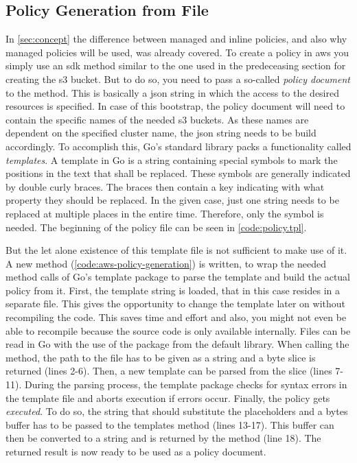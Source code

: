 \subsection{Policy Generation from File}
In \autoref{sec:concept} the difference between managed and inline policies, and also why managed policies will be used, was already covered.
To create a policy in \ac{aws} you simply use an \ac{sdk} method similar to the one used in the predeceasing section for creating the \ac{s3} bucket.
But to do so, you need to pass a so-called \emph{policy document} to the method.
This is basically a \ac{json} string in which the access to the desired resources is specified.
In case of this bootstrap, the policy document will need to contain the specific names of the needed \ac{s3} buckets.
As these names are dependent on the specified cluster name, the \ac{json} string needs to be build accordingly.
To accomplish this, Go's standard library packs a functionality called \emph{templates}.
A template in Go is a string containing special symbols to mark the positions in the text that shall be replaced.
These symbols are generally indicated by double curly braces.
The braces then contain a key indicating with what property they should be replaced.
In the given case, just one string needs to be replaced at multiple places in the entire time.
Therefore, only the symbol  is needed.
The beginning of the policy file can be seen in \autoref{code:policy.tpl}.



But the let alone existence of this template file is not sufficient to make use of it.
A new method (\autoref{code:aws-policy-generation}) is written, to wrap the needed method calls of Go's template package to parse the template and build the actual policy from it.
First, the template string is loaded, that in this case resides in a separate file.
This gives the opportunity to change the template later on without recompiling the code.
This saves time and effort and also, you might not even be able to recompile because the source code is only available internally.
Files can be read in Go with the use of the  package from the default library.
When calling the  method, the path to the file has to be given as a string and a byte slice is returned (lines 2-6).
Then, a new template can be parsed from the slice (lines 7-11).
During the parsing process, the template package checks for syntax errors in the template file and aborts execution if errors occur.
Finally, the policy gets \emph{executed}.
To do so, the string that should substitute the placeholders and a bytes buffer has to be passed to the templates  method (lines 13-17).
This buffer can then be converted to a string and is returned by the method (line 18).
The returned result is now ready to be used as a policy document.

